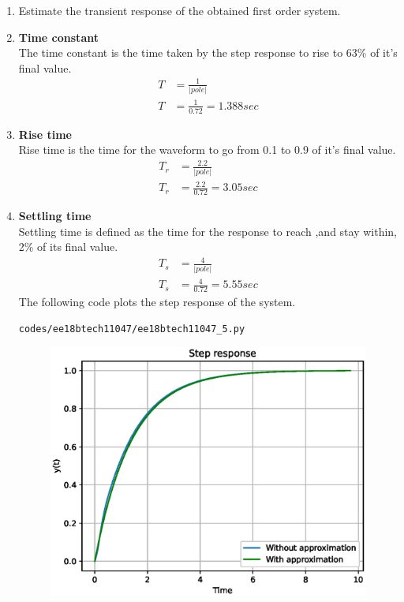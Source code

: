\begin{enumerate}[label=\thesubsection.\arabic*.,ref=\thesubsection.\theenumi]
\item Estimate the transient response of the obtained first order system.\\
\item \textbf{Time constant}\\
The time constant is the time taken by the step response to rise to 63\% of it's final value.
\begin{align}
T &= \frac{1}{|pole|}\\
T &= \frac{1}{0.72} = 1.388 sec
\end{align}
\item \textbf{Rise time}\\
Rise time is the time for the waveform to go from 0.1 to 0.9 of it's final value.
\begin{align}
T_{r} &= \frac{2.2}{|pole|}\\
T_{r} &= \frac{2.2}{0.72} = 3.05 sec
\end{align}
\item \textbf{Settling time}\\
Settling time is defined as the time for the response to reach ,and stay within, 2\% of its final value.
\begin{align}
T_{s} &= \frac{4}{|pole|}\\
T_{s} &= \frac{4}{0.72}=5.55 sec
\end{align}
The following code plots the step response of the system.
\begin{lstlisting}
codes/ee18btech11047/ee18btech11047_5.py
\end{lstlisting}
\begin{figure}[!ht]
\centering
\includegraphics[width=\columnwidth]{./figs/ee18btech11047/ee18btech11047_4.eps}
\caption{}
\label{fig:ee18btech11047_4}
\end{figure}
\end{enumerate}
